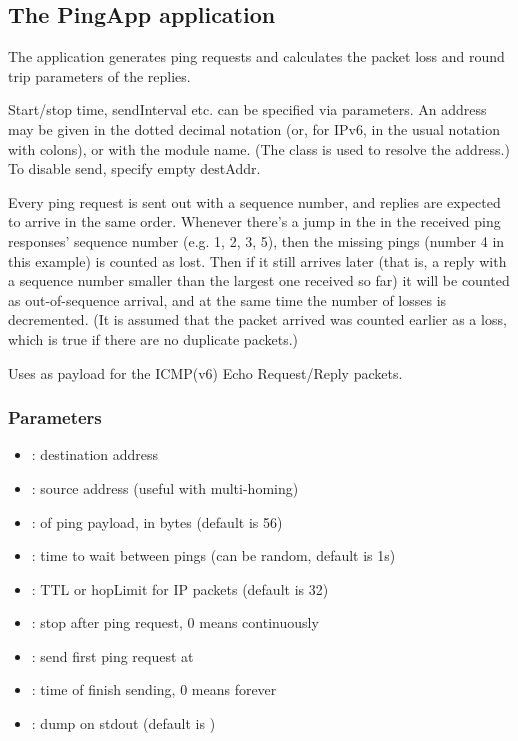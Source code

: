 \subsection{The PingApp application}

The  application
generates ping requests and calculates the packet loss and round trip
parameters of the replies.

Start/stop time, sendInterval etc. can be specified via parameters. An address
may be given in the dotted decimal notation (or, for IPv6, in the usual
notation with colons), or with the module name.
(The  class is used to resolve the address.)
To disable send, specify empty destAddr.

Every ping request is sent out with a sequence number, and replies are
expected to arrive in the same order. Whenever there's a jump in the
in the received ping responses' sequence number (e.g. 1, 2, 3, 5), then
the missing pings (number 4 in this example) is counted as lost.
Then if it still arrives later (that is, a reply with a sequence number
smaller than the largest one received so far) it will be counted as
out-of-sequence arrival, and at the same time the number of losses is
decremented. (It is assumed that the packet arrived was counted earlier as a loss,
which is true if there are no duplicate packets.)

Uses  as payload for the ICMP(v6) Echo Request/Reply packets.

\subsubsection*{Parameters}

\begin{itemize}
  \item {}: destination address
  \item {}: source address (useful with multi-homing)
  \item {}: of ping payload, in bytes (default is 56)
  \item {}: time to wait between pings (can be random, default is 1s)
  \item {}: TTL or hopLimit for IP packets (default is 32)
  \item {}: stop after  ping request, 0 means continuously
  \item {}: send first ping request at 
  \item {}: time of finish sending, 0 means forever
  \item {}: dump on stdout (default is )
\end{itemize}


